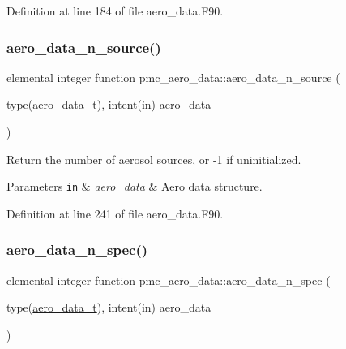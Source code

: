 Definition at line 184 of file aero\+\_\+data.\+F90.

\mbox{\label{namespacepmc__aero__data_a270b6c2baba361257005658bc293ecde}} 
\subsubsection{\texorpdfstring{aero\+\_\+data\+\_\+n\+\_\+source()}{aero\_data\_n\_source()}}
{\footnotesize\ttfamily elemental integer function pmc\+\_\+aero\+\_\+data\+::aero\+\_\+data\+\_\+n\+\_\+source (\begin{DoxyParamCaption}\item[{type(\mbox{\hyperlink{structpmc__aero__data_1_1aero__data__t}{aero\+\_\+data\+\_\+t}}), intent(in)}]{aero\+\_\+data }\end{DoxyParamCaption})}



Return the number of aerosol sources, or -\/1 if uninitialized. 


\begin{DoxyParams}[1]{Parameters}
\mbox{\tt in}  & {\em aero\+\_\+data} & Aero data structure. \\
\hline
\end{DoxyParams}


Definition at line 241 of file aero\+\_\+data.\+F90.

\mbox{\label{namespacepmc__aero__data_a0ad6e20bd94def8cbbcac7dda7ec3089}} 
\subsubsection{\texorpdfstring{aero\+\_\+data\+\_\+n\+\_\+spec()}{aero\_data\_n\_spec()}}
{\footnotesize\ttfamily elemental integer function pmc\+\_\+aero\+\_\+data\+::aero\+\_\+data\+\_\+n\+\_\+spec (\begin{DoxyParamCaption}\item[{type(\mbox{\hyperlink{structpmc__aero__data_1_1aero__data__t}{aero\+\_\+data\+\_\+t}}), intent(in)}]{aero\+\_\+data }\end{DoxyParamCaption})}



